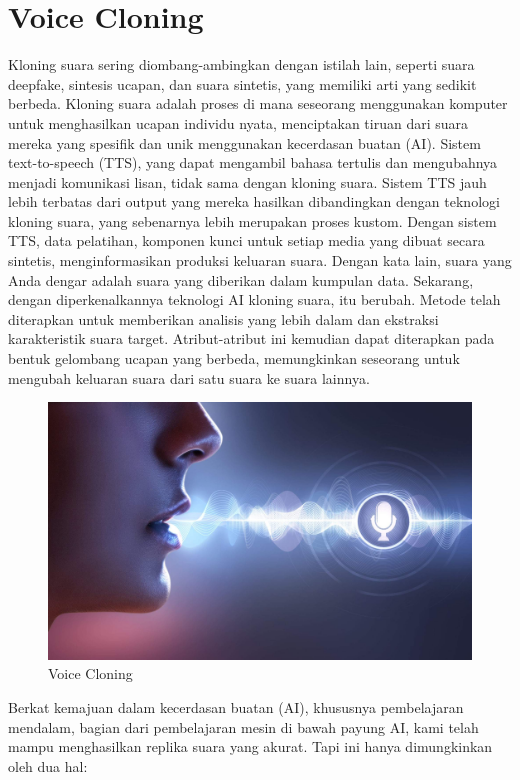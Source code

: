 \section{Voice Cloning}
Kloning suara sering diombang-ambingkan dengan istilah lain, seperti suara deepfake, sintesis ucapan, dan suara sintetis, yang memiliki arti yang sedikit berbeda. Kloning suara adalah proses di mana seseorang menggunakan komputer untuk menghasilkan ucapan individu nyata, menciptakan tiruan dari suara mereka yang spesifik dan unik menggunakan kecerdasan buatan (AI)\cite{8999436}. Sistem text-to-speech (TTS), yang dapat mengambil bahasa tertulis dan mengubahnya menjadi komunikasi lisan, tidak sama dengan kloning suara. Sistem TTS jauh lebih terbatas dari output yang mereka hasilkan dibandingkan dengan teknologi kloning suara, yang sebenarnya lebih merupakan proses kustom. Dengan sistem TTS, data pelatihan, komponen kunci untuk setiap media yang dibuat secara sintetis, menginformasikan produksi keluaran suara. Dengan kata lain, suara yang Anda dengar adalah suara yang diberikan dalam kumpulan data. Sekarang, dengan diperkenalkannya teknologi AI kloning suara, itu berubah. Metode telah diterapkan untuk memberikan analisis yang lebih dalam dan ekstraksi karakteristik suara target. Atribut-atribut ini kemudian dapat diterapkan pada bentuk gelombang ucapan yang berbeda, memungkinkan seseorang untuk mengubah keluaran suara dari satu suara ke suara lainnya\cite{9239750}.

\begin{figure}[H]
        \centerline{\includegraphics[scale=.15]{figures/voicecloning}}
        \caption{Voice Cloning}
		\label{voicecloning}
\end{figure}

Berkat kemajuan dalam kecerdasan buatan (AI), khususnya pembelajaran mendalam, bagian dari pembelajaran mesin di bawah payung AI, kami telah mampu menghasilkan replika suara yang akurat. Tapi ini hanya dimungkinkan oleh dua hal:

